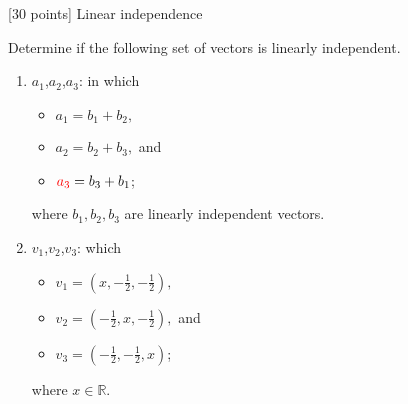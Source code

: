 [30 points] Linear independence\\

\vspace{0.1in}

Determine if the following set of vectors is linearly independent. \\
\begin{enumerate}

\item 
$a_1$,$a_2$,$a_3$: in which
\begin{itemize}
\item $a_1 = b_1+ b_2,$
\item $a_2 = b_2+ b_3,$ and
\item ${\color{red}a_3} = b_3+ b_1$;
\end{itemize}
where $b_1, b_2, b_3$ are linearly independent vectors.

\item 
$v_1$,$v_2$,$v_3$: which
\begin{itemize}
\item $v_{1}=\left(x,-\frac{1}{2},-\frac{1}{2}\right),$
\item $v_{2}=\left(-\frac{1}{2},x,-\frac{1}{2}\right),$ and 
\item $v_{3}=\left(-\frac{1}{2},-\frac{1}{2},x\right)$;
\end{itemize}
where $x\in\mathbb{R}$.
\end{enumerate}

